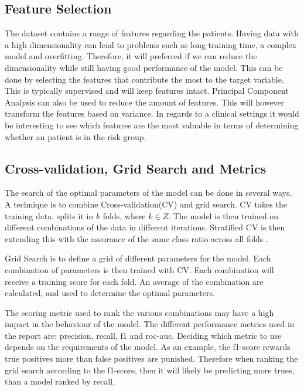 \subsection{Feature Selection}
The dataset contains a range of features regarding the patients. Having data with a high dimensionality can lead to problems such as long training time, a complex model and overfitting. Therefore, it will preferred if we can reduce the dimensionality while still having good performance of the model. This can be done by selecting the features that contribute the most to the target variable. This is typically supervised and will keep features intact. Principal Component Analysis can also be used to reduce the amount of features. This will however transform the features based on variance. In regards to a clinical settings it would be interesting to see which features are the most valuable in terms of determining whether an patient is in the risk group.

\subsection{Cross-validation, Grid Search and Metrics}
The search of the optimal parameters of the model can be done in several ways. A technique is to combine Cross-validation(CV) and grid search. CV takes the training data, splits it in $k$ folds, where $k \in Z$. The model is then trained on different combinations of the data in different iterations. Stratified CV is then extending this with the assurance of the same class ratio across all folds \cite{CV}.

Grid Search is to define a grid of different parameters for the model. Each combination of parameters is then trained with CV. Each combination will receive a training score for each fold. An average of the combination are calculated, and used to determine the optimal parameters.

The scoring metric used to rank the various combinations may have a high impact in the behaviour of the model. The  different performance metrics used in the report are: precision, recall, f1 and roc-auc. Deciding which metric to use depends on the requirements of the model. As an example, the f1-score rewards true positives more than false positives are punished. Therefore when ranking the grid search according to the f1-score, then it will likely be predicting more trues, than a model ranked by recall.    



